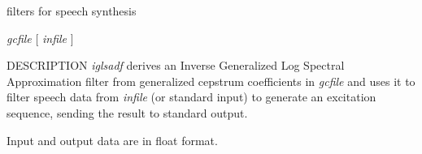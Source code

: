 % 
% 
% 
% 
%                                                                        
%
%
{filters for speech synthesis}

\begin{synopsis}
\item [iglsadf] [ --m $M$ ] [ --g $G$ ] [ --p $P$ ] [ --i $I$ ]
	  	[ --n ] [ --k ] {\em gcfile}  [ {\em infile} ] 
\end{synopsis}

\begin{qsection}{DESCRIPTION}
{\em iglsadf} derives an Inverse Generalized Log Spectral Approximation filter 
from generalized cepstrum coefficients in {\em gcfile} 
and uses it to filter speech data from {\em infile} (or standard input) 
to generate an excitation sequence, 
sending the result to standard output.

Input and output data are in float format.

\end{qsection}

